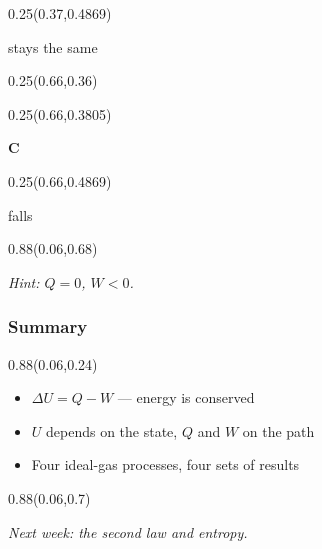 \documentclass[aspectratio=169]{beamer}
\begin{document}
\begin{frame}[t]
\begin{textblock}{0.25}(0.37,0.4869)
{\centering\fontsize{14}{17}\selectfont \textcolor[HTML]{FFFFFF}{stays the same}\par}
\end{textblock}

%
\begin{textblock}{0.25}(0.66,0.36)
\end{textblock}

\begin{textblock}{0.25}(0.66,0.3805)
{\centering\fontsize{26}{31}\selectfont \textcolor[HTML]{FFFFFF}{\textbf{C}}\par}
\end{textblock}

\begin{textblock}{0.25}(0.66,0.4869)
{\centering\fontsize{14}{17}\selectfont \textcolor[HTML]{FFFFFF}{falls}\par}
\end{textblock}

\begin{textblock}{0.88}(0.06,0.68)
{\centering\fontsize{14}{17}\selectfont \textcolor[HTML]{666666}{\textit{Hint: $Q = 0$, $W < 0$.}}\par}
\end{textblock}
\end{frame}

\begin{frame}[t]
  \frametitle{Summary}

\begin{textblock}{0.88}(0.06,0.24)
{\raggedright\fontsize{19}{23}\selectfont \begin{itemize}
\item $\Delta U = Q - W$ — energy is conserved
\item $U$ depends on the state, $Q$ and $W$ on the path
\item Four ideal-gas processes, four sets of results
\end{itemize}\par}
\end{textblock}

\begin{textblock}{0.88}(0.06,0.7)
{\centering\fontsize{15}{18}\selectfont \textcolor[HTML]{1F4E79}{\textit{Next week: the second law and entropy.}}\par}
\end{textblock}
\end{frame}
\end{document}
